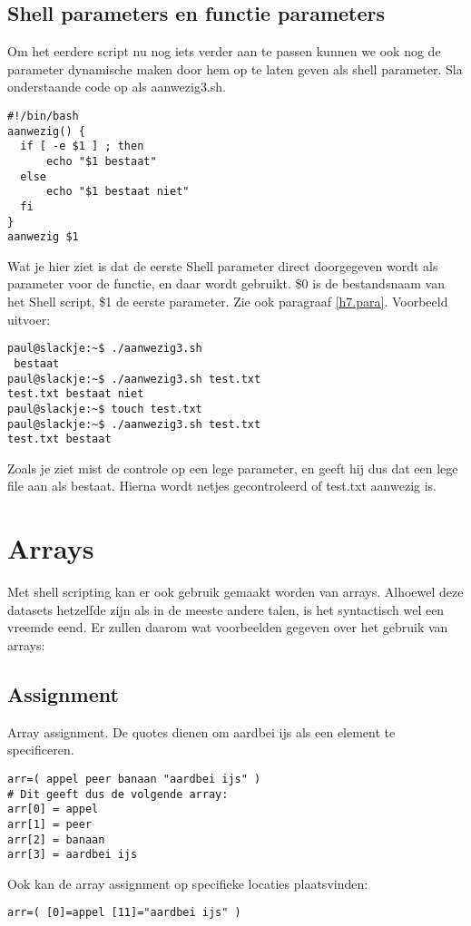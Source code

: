 \subsection{Shell parameters en functie parameters}
Om het eerdere script nu nog iets verder aan te passen kunnen we ook nog de parameter dynamische maken door hem op te laten geven als shell parameter. Sla onderstaande code op als aanwezig3.sh.
\begin{lstlisting}
#!/bin/bash
aanwezig() {
  if [ -e $1 ] ; then
      echo "$1 bestaat"
  else
      echo "$1 bestaat niet"
  fi
}
aanwezig $1
\end{lstlisting} 
Wat je hier ziet is dat de eerste Shell parameter direct doorgegeven wordt als parameter voor de functie, en daar wordt gebruikt. \$0 is de bestandsnaam van het Shell script, \$1 de eerste parameter. Zie ook paragraaf \ref{h7.para}.
Voorbeeld uitvoer:
\begin{lstlisting}
paul@slackje:~$ ./aanwezig3.sh 
 bestaat
paul@slackje:~$ ./aanwezig3.sh test.txt
test.txt bestaat niet
paul@slackje:~$ touch test.txt
paul@slackje:~$ ./aanwezig3.sh test.txt
test.txt bestaat
\end{lstlisting}
Zoals je ziet mist de controle op een lege parameter, en geeft hij dus dat een lege file aan als bestaat. Hierna wordt netjes gecontroleerd of test.txt aanwezig is.

\section{Arrays}
Met shell scripting kan er ook gebruik gemaakt worden van arrays. Alhoewel deze datasets hetzelfde zijn als in de meeste andere talen, is het syntactisch wel een vreemde eend. Er zullen daarom wat voorbeelden gegeven over het gebruik van arrays:

\subsection{Assignment}
Array assignment. De quotes dienen om aardbei ijs als een element te specificeren.
\begin{lstlisting}
arr=( appel peer banaan "aardbei ijs" )
# Dit geeft dus de volgende array:
arr[0] = appel
arr[1] = peer
arr[2] = banaan
arr[3] = aardbei ijs
\end{lstlisting}

Ook kan de array assignment op specifieke locaties plaatsvinden:
\begin{lstlisting}
arr=( [0]=appel [11]="aardbei ijs" )
\end{lstlisting}

